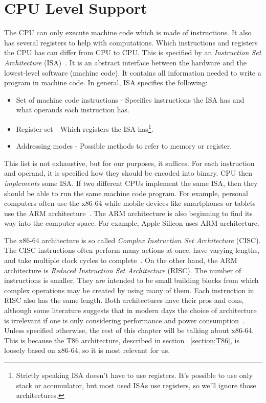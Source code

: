 \section{CPU Level Support}\label{section:cpu-debug-support}
The CPU can only execute machine code which is made of instructions. It also
has several registers to help with computations. Which instructions and
registers the CPU has can differ from CPU to CPU. This is specified by an
\textit{Instruction Set Architecture} (ISA)~\cite{isa}. It is an abstract
interface between the hardware and the lowest-level software (machine code). It
contains all information needed to write a program in machine code. In general,
ISA specifies the following: 
\begin{itemize}
    \item Set of machine code instructions - Specifies instructions the ISA has
        and what operands each instruction has.
    \item Register set - Which registers the ISA has\footnote{Strictly speaking
        ISA doesn't have to use registers. It's possible to use only stack or
        accumulator, but most used ISAs use registers, so we'll ignore those
        architectures. }.   
    \item Addressing modes - Possible methods to refer to memory or register. 
\end{itemize}
This list is not exhaustive, but for our purposes, it suffices. For each
instruction and operand, it is specified how they should be encoded into
binary. CPU then \textit{implements} some ISA. If two different CPUs implement
the same ISA, then they should be able to run the same machine code program.
For example, personal computers often use the x86-64 while mobile devices like
smartphones or tablets use the ARM architecture~\cite{riscvscisc2}. The ARM
architecture is also beginning to find its way into the computer space. For
example, Apple Silicon uses ARM architecture.

The x86-64 architecture is so called \textit{Complex Instruction Set
Architecture} (CISC). The CISC instructions often perform many actions at once,
have varying lengths, and take multiple clock cycles to
complete~\cite{intel-manual}. On the other hand, the ARM architecture is
\textit{Reduced Instruction Set Architecture} (RISC). The number of
instructions is smaller. They are intended to be small building blocks from
which complex operations may be created by using many of them. Each instruction
in RISC also has the same length. Both architectures have their pros and cons,
although some literature suggests that in modern days the choice of
architecture is irrelevant if one is only considering performance and power
consumption~\cite{riscvscisc1, riscvscisc2}. Unless specified otherwise, the
rest of this chapter will be talking about x86-64. This is because the T86
architecture, described in section ~\ref{section:T86}, is loosely based on
x86-64, so it is most relevant for us.

